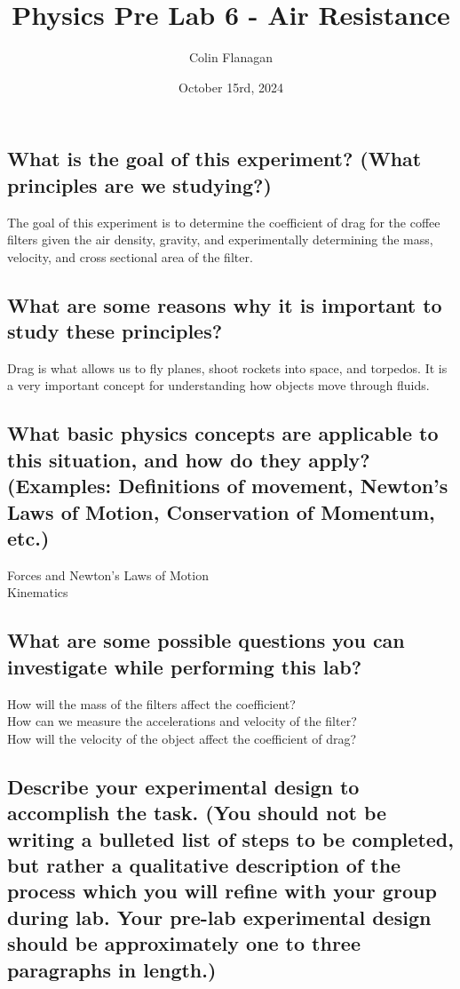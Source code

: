 \documentclass{article}
\title{Physics Pre Lab 6 - Air Resistance}
\author{Colin Flanagan}
\date{October 15rd, 2024}
\begin{document}
\maketitle

\subsection*{What is the goal of this experiment? (What principles are we studying?)}

    The goal of this experiment is to determine the coefficient of drag for the coffee filters given the air density, gravity, and experimentally determining the mass, velocity, and cross sectional area of the filter.
    

\subsection*{What are some reasons why it is important to study these principles?
}

    Drag is what allows us to fly planes, shoot rockets into space, and torpedos. It is a very important concept for understanding how objects move through fluids.  
    
\subsection*{What basic physics concepts are applicable to this situation, and how do they apply? (Examples: Definitions of movement, Newton’s Laws of Motion, Conservation of Momentum, etc.)}

    Forces and Newton's Laws of Motion\\
    Kinematics

\subsection*{What are some possible questions you can investigate while performing this lab?
}

   How will the mass of the filters affect the coefficient? \\
   
   How can we measure the accelerations and velocity of the filter?\\

   How will the velocity of the object affect the coefficient of drag?\\

\subsection*{Describe your experimental design to accomplish the task. (You should not be writing a bulleted list of steps to be completed, but rather a qualitative description of the process which you will refine with your group during lab. Your pre-lab experimental design should be approximately one to three paragraphs in length.)}
\end{document}
